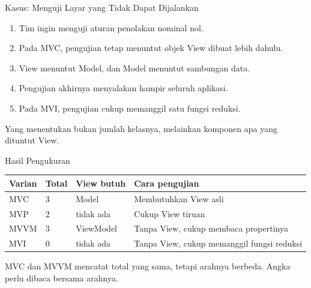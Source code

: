 \documentclass[aspectratio=169, table, 12pt]{beamer}
\begin{document}
\begin{frame}{{\Large Kasus: Menguji Layar yang Tidak Dapat Dijalankan}}
  \vspace{8pt}
  \begin{enumerate}
    \item Tim ingin menguji aturan penolakan nominal nol.
    \item Pada MVC, pengujian tetap menuntut objek View dibuat lebih dahulu.
    \item View menuntut Model, dan Model menuntut sambungan data.
    \item Pengujian akhirnya menyalakan hampir seluruh aplikasi.
    \item Pada MVI, pengujian cukup memanggil satu fungsi reduksi.
  \end{enumerate}

  \vspace{8pt}
  {\small Yang menentukan bukan jumlah kelasnya, melainkan komponen apa yang
  dituntut View.}
\end{frame}

\begin{frame}{{\Large Hasil Pengukuran}}
  \vspace{8pt}
  \centering
  \begin{tabularx}{0.95\textwidth}{|l|l|l|X|}
    \hline
    \textbf{Varian} & \textbf{Total} & \textbf{View butuh} & \textbf{Cara pengujian} \\
    \hline
    MVC & 3 & Model & Membutuhkan View asli \\
    \hline
    MVP & 2 & tidak ada & Cukup View tiruan \\
    \hline
    MVVM & 3 & ViewModel & Tanpa View, cukup membaca propertinya \\
    \hline
    MVI & 0 & tidak ada & Tanpa View, cukup memanggil fungsi reduksi \\
    \hline
  \end{tabularx}

  \vspace{10pt}
  {\small MVC dan MVVM mencatat total yang sama, tetapi arahnya berbeda. Angka
  perlu dibaca bersama arahnya.}
\end{frame}
\end{document}
